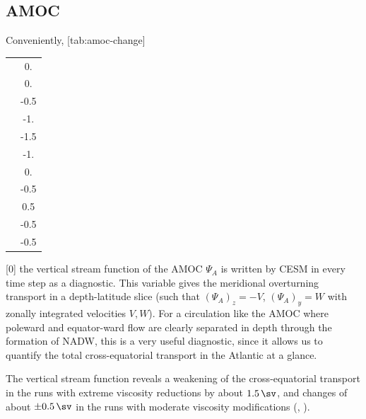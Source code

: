 \clearpage
\subsection{AMOC}
\label{sec:obs-amoc}
Conveniently,%
[tab:amoc-change]{%
	\begin{tabular}{lS[table-format=1.1]}
		 & 0. \\
		 & 0. \\
		 & -0.5 \\
		 & -1. \\[1ex]
		 & -1.5 \\
		 & -1. \\
		 & 0. \\
		 & -0.5 \\
		 & 0.5 \\[1ex]
		 & -0.5 \\
		 & -0.5
	\end{tabular}
}[0]%
the vertical stream function of the \ac{AMOC} \(\Psi_A\) is written by \ac{CESM} in every time step as a diagnostic. This variable gives the meridional overturning transport in a depth-latitude slice (such that \((\Psi_A)_z = -V\), \((\Psi_A)_y = W\) with zonally integrated velocities \(V, W\)). For a circulation like the \ac{AMOC} where poleward and equator-ward flow are clearly separated in depth through the formation of \ac{NADW}, this is a very useful diagnostic, since it allows us to quantify the total cross-equatorial transport in the Atlantic at a glance.

The vertical stream function reveals a weakening of the cross-equatorial transport in the runs with extreme viscosity reductions by about \(\SI{1.5}{\sv}\), and changes of about \(\pm \SI{0.5}{\sv} \) in the runs with moderate viscosity modifications (, ).

